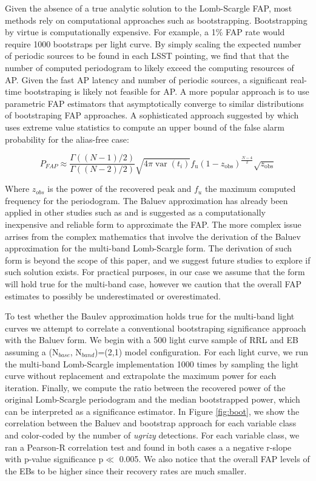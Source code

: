 \documentclass[DM,authoryear,toc]{lsstdoc}
\begin{document}
Given the absence of a true analytic solution to the Lomb-Scargle FAP, most methods rely on computational approaches such as bootstrapping.
Bootstrapping by virtue is computationally expensive.
For example, a 1$\%$ FAP rate would require 1000 bootstraps per light curve.
By simply scaling the expected number of periodic sources to be found in each LSST pointing, we find that that the number of computed periodogram to likely exceed the computing resources of AP.
Given the fast AP latency and number of periodic sources, a significant real-time bootstraping is likely not feasible for AP.
A more popular approach is to use parametric FAP estimators that asymptotically converge to similar distributions of bootstraping FAP approaches.
A sophisticated approach suggested by \citet{Baluev:Baluev2008} which uses extreme value statistics to compute an upper bound of the false alarm probability for the alias-free case:

\begin{equation}
P_{FAP} \approx \frac{\Gamma((N-1) / 2)}{\Gamma((N-2) / 2)} \sqrt{4 \pi \operatorname{var}\left(t_i\right)} f_{\mathrm{u}}\left(1-z_{\mathrm{obs}}\right)^{\frac{N-4}{2}} \sqrt{z_{\mathrm{obs}}}
\end{equation}

Where $z_{obs}$ is the power of the recovered peak and $f_u$ the maximum computed frequency for the periodogram.
The Baluev approximation has already been applied in other studies such as \citet{Suveges:Suveges15} and is suggested as a computationally inexpensive and reliable form to approximate the FAP.
The more complex issue arrises from the complex mathematics that involve the derivation of the Baluev approximation for the multi-band Lomb-Scargle form.
The derivation of such form is beyond the scope of this paper, and we suggest future studies to explore if such solution exists.
For practical purposes, in our case we assume that the \citet{Baluev:Baluev2008}  form will hold true for the multi-band case, however we caution that the overall FAP estimates to possibly be underestimated or overestimated.



To test whether the Baulev approximation holds true for the multi-band light curves we attempt to correlate a conventional bootstraping significance approach with the Baluev form.
We begin with a 500 light curve sample of RRL and EB assuming a (N$_{base}$, N$_{band}$)=(2,1) model configuration.
For each light curve, we run the multi-band Lomb-Scargle implementation 1000 times by sampling the light curve without replacement and extrapolate the maximum power for each iteration.
Finally, we compute the ratio between the recovered power of the original Lomb-Scargle periodogram and the median bootstrapped power, which can be interpreted as a significance estimator.
In Figure \ref{fig:boot}, we show the correlation between the Baluev and bootstrap approach for each variable class and color-coded by the number of \textit{ugrizy} detections.
For each variable class, we ran a Pearson-R correlation test and found in both cases a a negative r-slope with p-value significance p$\ll$ 0.005.
We also notice that the overall FAP levels of the EBs to be higher since their recovery rates are much smaller.
\end{document}
